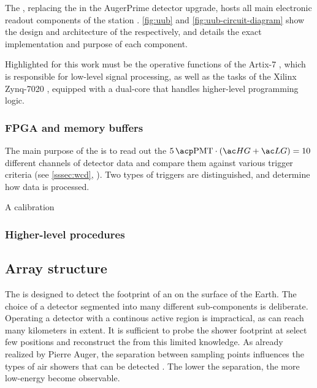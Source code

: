 The \UUB, replacing the \UB in the AugerPrime detector upgrade, hosts all main 
electronic readout components of the station 
\cite{collaborationPierreAugerObservatory2016}. \cref{fig:uub} and 
\cref{fig:uub-circuit-diagram} show the design and architecture of the \UUB \PCB
respectively, and \cite{suomijarviNewElectronicsSurface2018} details the exact 
implementation and purpose of each component. 

Highlighted for this work must be the operative functions of the Artix-7 \FPGA 
\cite{xilinx7SeriesFPGAs2020}, which is responsible for low-level signal 
processing, as well as the tasks of the Xilinx Zynq-7020 \SOC, equipped with a
dual-core \CPU \cite{amdZynq7000SoC2023} that handles higher-level programming 
logic. 

\subsubsection{FPGA and memory buffers}
\label{sssec:fpga-buffers}

The main purpose of the \FPGA is to read out the 
$\SI{5}{\PMTs} \cdot (\HG + \LG) = 10$ different channels of detector data and 
compare them against various trigger criteria (see \cref{sssec:wcd}, 
). Two types of triggers are distinguished, and determine how data is
processed.

A calibration 

\subsubsection{Higher-level procedures}

\subsection{Array structure}
\label{ssec:array-structure}

The \SD is designed to detect the footprint of an \EAS on the surface of the 
Earth. The choice of a detector segmented into many different sub-components is
deliberate. Operating a detector with a continous active region is impractical, 
as \EASs can reach many kilometers in extent. It is sufficient to probe the 
shower footprint at select few positions and reconstruct the \EAS from this 
limited knowledge. As already realized by Pierre Auger, the separation between 
sampling points influences the types of air showers that can be detected 
. The lower the separation, the more low-energy \EAS become 
observable.


